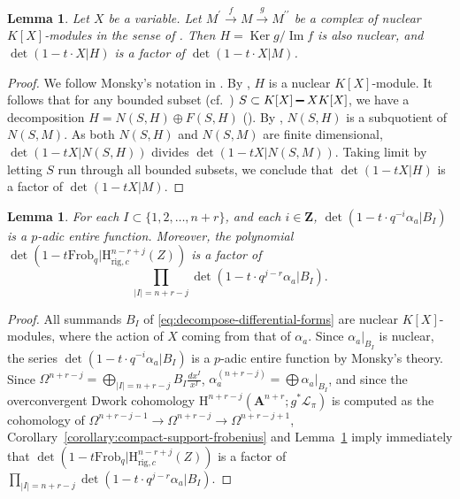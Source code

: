 \documentclass{amsart}
\numberwithin{equation}{section}
\theoremstyle{plain}
\newtheorem{lemma}[equation]{Lemma}
\theoremstyle{definition}
\renewcommand{\mathbb}{\mathbf}
\renewcommand{\setminus}{\mathbin{\rule[0.2em]{0.67em}{0.12em}}}%
\begin{document}
\begin{lemma}%
\label{lemma:nuclear-factor}
Let \(X\) be a variable.
Let \(M^{\prime} \xrightarrow{f} M \xrightarrow{g} M^{\prime\prime}\) be a complex of nuclear \(K[X]\)-modules
in the sense of \textup{\cite[Definition~1.4]{monsky:formal-cohomology-3}}.
Then \(H=\operatorname{Ker}g/\operatorname{Im}f\) is also nuclear, and
\(\det(1 - t \cdot X | H)\) is
a factor of \(\det(1-t\cdot X | M)\).
\end{lemma}

\begin{proof}
We follow Monsky's notation in \cite[\S1]{monsky:formal-cohomology-3}.
By \cite[Theorem~1.4]{monsky:formal-cohomology-3}, \(H\) is a nuclear
\(K[X]\)-module.  It follows that for any bounded subset
(cf.~\cite[Definition 1.3]{monsky:formal-cohomology-3})
\(S \subset K[X]\setminus XK[X]\), we have a decomposition
\(H = N(S,H)\oplus F(S,H)\)
(\cite[Theorem~1.1]{monsky:formal-cohomology-3}).  By \cite[Proof of
Theorem~1.4, eighth line]{monsky:formal-cohomology-3}, \(N(S,H)\) is a
subquotient of \(N(S,M)\).  As both \(N(S,H)\) and \(N(S,M)\) are
finite dimensional, \(\det(1-tX | N(S,H))\) divides
\(\det(1-tX | N(S,M))\).  Taking limit by letting \(S\) run through
all bounded subsets, we conclude that \(\det(1-tX| H)\) is a factor
of \(\det(1-tX | M)\).
\end{proof}

\begin{lemma}%
\label{lemma:factor}
For each \(I \subset \{1,2,\ldots,n+r\}\), and each \(i \in \mathbb{Z}\),
\(\det(1-t\cdot q^{-i}\alpha_{a} | B_{I})\)
is a \(p\)-adic entire function. Moreover, the polynomial
\(\det(1-t\mathrm{Frob}_q| \mathrm{H}^{n-r+j}_{\mathrm{rig},c}(Z))\)
is a factor of
\[
\prod\limits_{|I|=n+r-j}\det(1-t\cdot q^{j-r}\alpha_{a} | B_{I}).
\]
\end{lemma}

\begin{proof}
All summands \(B_{I}\) of \eqref{eq:decompose-differential-forms} are
nuclear \(K[X]\)-modules, where the action of \(X\) coming from that
of \(\alpha_{a}\).  Since \(\alpha_{a}|_{B_{I}}\) is nuclear, the
series \(\det(1-t \cdot q^{-i}\alpha_{a} | B_I)\) is a \(p\)-adic
entire function by Monsky's theory.  Since
\(\Omega^{n+r-j} = \bigoplus_{|I|=n+r-j}B_{I} \frac{dx^{I}}{x^{I}}\),
\(\alpha^{(n+r-j)}_{a} = \bigoplus \alpha_{a}|_{B_{I}}\), and since
the overconvergent Dwork cohomology
\(\mathrm{H}^{n+r-j}(\mathbb{A}^{n+r};g^{\ast}\mathcal{L}_{\pi})\) is
computed as the cohomology of
\(\Omega^{n+r-j-1}\to\Omega^{n+r-j}\to\Omega^{n+r-j+1}\),
Corollary~\ref{corollary:compact-support-frobenius} and
Lemma~\ref{lemma:nuclear-factor} imply immediately that
\(\det(1-t\mathrm{Frob}_{q}|\mathrm{H}^{n-r+j}_{\mathrm{rig},c}(Z))\)
is a factor of
\(\prod\limits_{|I|=n+r-j}\det(1-t\cdot q^{j-r}\alpha_{a}|B_{I})\).
\end{proof}
\end{document}
